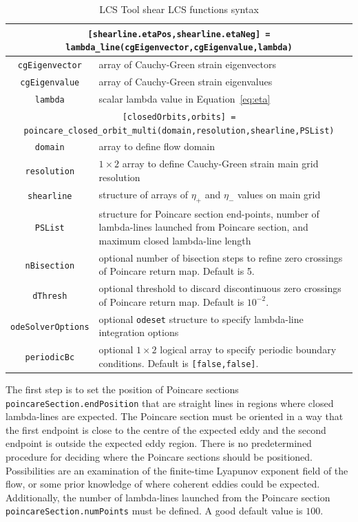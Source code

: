 \documentclass{article}
\begin{document}
\begin{table}
\begin{tabular}{|c|p{}|}
\hline \hline
\multicolumn{2}{|p{\textwidth}|}{\lstinline![shearline.etaPos,shearline.etaNeg] = lambda_line(cgEigenvector,cgEigenvalue,lambda)!}\\
\hline
\lstinline!cgEigenvector! & array of Cauchy-Green strain eigenvectors\\
\hline
\lstinline!cgEigenvalue! & array of Cauchy-Green strain eigenvalues\\
\hline
\lstinline!lambda! & scalar lambda value in Equation~\eqref{eq:eta}\\
\hline \hline
\multicolumn{2}{|p{\textwidth}|}{\lstinline![closedOrbits,orbits] = poincare_closed_orbit_multi(domain,resolution,shearline,PSList)!}\\
\hline
\lstinline!domain! & array to define flow domain\\
\hline
\lstinline!resolution! & $1 \times 2$ array to define Cauchy-Green strain main grid resolution\\
\hline
\lstinline!shearline! & structure of arrays of $\eta_+$ and $\eta_-$ values on main grid\\
\hline
\lstinline!PSList! & structure for Poincare section end-points, number of lambda-lines launched from Poincare section, and maximum closed lambda-line length\\
\hline
\lstinline!nBisection! & optional number of bisection steps to refine zero crossings of Poincare return map. Default is 5.\\
\hline
\lstinline!dThresh! & optional threshold to discard discontinuous zero crossings of Poincare return map. Default is $10^{-2}$.\\
\hline
\lstinline!odeSolverOptions! & optional \lstinline!odeset! structure to specify lambda-line integration options\\
\hline
\lstinline!periodicBc! & optional $1 \times 2$ logical array to specify periodic boundary conditions. Default is \lstinline![false,false]!.\\
\hline \hline
\end{tabular}
\caption{LCS Tool shear LCS functions syntax}
\label{t:Shear LCS functions}
\end{table}

The first step is to set the position of Poincare sections \lstinline!poincareSection.endPosition! that are straight lines in regions where closed lambda-lines are expected. The Poincare section must be oriented in a way that the first endpoint is close to the centre of the expected eddy and the second endpoint is outside the expected eddy region. There is no predetermined procedure for deciding where the Poincare sections should be positioned. Possibilities are an examination of the finite-time Lyapunov exponent field of the flow, or some prior knowledge of where coherent eddies could be expected. Additionally, the number of lambda-lines launched from the Poincare section \lstinline!poincareSection.numPoints! must be defined. A good default value is $100$.
\end{document}
